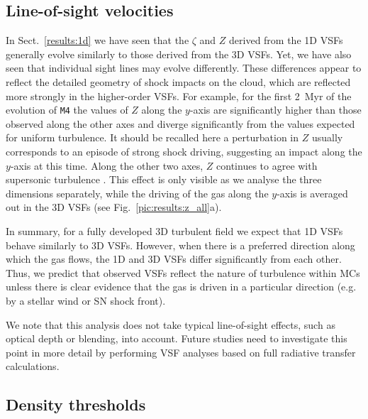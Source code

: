 \documentclass{aa}		%
\begin{document}
\subsection{Line-of-sight velocities}\label{discussion:1d}

In Sect.~\ref{results:1d} we have seen that the $\zeta$ and $Z$ derived from the 1D VSFs generally evolve similarly to those derived from the 3D VSFs.
Yet, we have also seen that individual sight lines may evolve differently.
These differences appear to reflect the detailed geometry of shock impacts on the cloud, which are reflected more strongly in the higher-order VSFs.
For example, for the first 2~Myr of the evolution of \texttt{M4} the values of $Z$ along the $y$-axis are significantly higher than those observed along the other axes and diverge significantly from the values expected for uniform turbulence.
It should be recalled here a perturbation in $Z$ usually corresponds to an episode of strong shock driving, suggesting an impact along the $y$-axis at this time. 
Along the other two axes, $Z$ continues to agree with supersonic turbulence \citep{Boldyrev2002}.
This effect is only visible as we analyse the three dimensions separately, while the driving of the gas along the $y$-axis is averaged out in the 3D VSFs (see Fig.~\ref{pic:results:z_all}a).

In summary, for a fully developed 3D turbulent field we expect that 1D VSFs behave similarly to 3D VSFs.
However, when there is a preferred direction along which the gas flows, the 1D and 3D VSFs differ significantly from each other. 
Thus, we predict that observed VSFs reflect the nature of turbulence within MCs unless there is clear evidence that the gas is driven in a particular direction (e.g. by a stellar wind or SN shock front).

We note that this analysis does not take typical line-of-sight effects, such as optical depth or blending, into account. 
Future studies need to investigate this point in more detail by performing VSF analyses based on full radiative transfer calculations.

\subsection{Density thresholds}\label{discussion:densthres}
\end{document}
